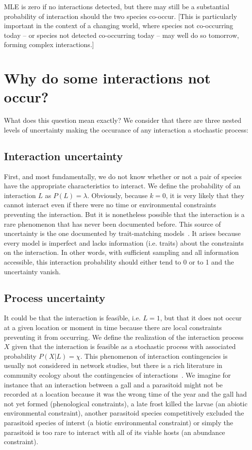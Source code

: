\documentclass[12pt]{article}
\begin{document}
  MLE is zero if no interactions detected, but there may still be a substantial probability of interaction should the two species co-occur. [This is particularly important in the context of a changing world, where species not co-occurring today – or species not detected co-occurring today – may well do so tomorrow, forming complex interactions.]


\section*{Why do some interactions not occur?}

  What does this question mean exactly? We consider that there are three nested levels of uncertainty making the occurance of any interaction a stochastic process:  


    \subsection*{Interaction uncertainty} 

    First, and most fundamentally, we do not know whether or not a pair of species have the appropriate characteristics to interact. We define the probability of an interaction $L$ as $P(L)=\lambda$. Obviously, because $k=0$, it is very likely that they cannot interact even if there were no time or environmental constraints preventing the interaction. But it is nonetheless possible that the interaction is a rare phenomenon that has never been documented before. This source of uncertainty is the one documented by trait-matching models~\citep{}. It arises because every model is imperfect and lacks information (i.e. traits) about the constraints on the interaction. In other words, with sufficient sampling and all information accessible, this interaction probability should either tend to 0 or to 1 and the uncertainty vanish.  


    \subsection*{Process uncertainty} 

    It could be that the interaction is feasible, i.e. $L=1$, but that it does not occur at a given location or moment in time because there are local constraints preventing it from occurring. We define the realization of the interaction process $X$ given that the interaction is feasible as a stochastic process with associated probability $P(X|L)=\chi$. This phenomenon of interaction contingencies is usually not considered in network studies, but there is a rich literature in community ecology about the contingencies of interactions~\citep{}. We imagine for instance that an interaction between a gall and a parasitoid might not be recorded at a location because it was the wrong time of the year and the gall had not yet formed (phenological constraints), a late frost killed the larvae (an abiotic environmental constraint), another parasitoid species competitively excluded the parasitoid species of interst (a biotic environmental constraint) or simply the parasitoid is too rare to interact with all of its viable hosts (an abundance constraint). 
\end{document}

